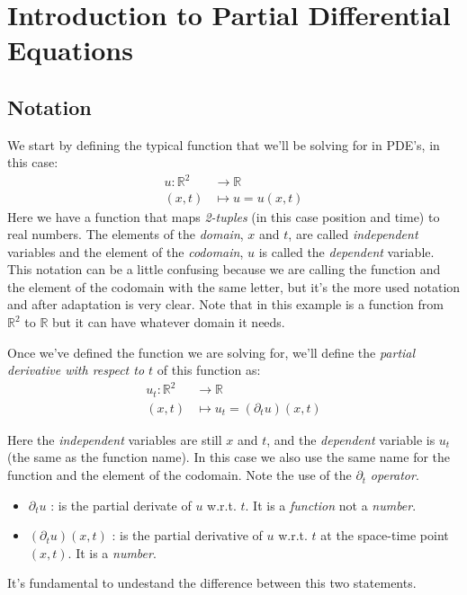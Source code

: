 \documentclass[../pde.tex]{subfiles}
\begin{document}
    \chapter{\sffamily Introduction to Partial Differential Equations}
    
    \section{\sffamily Notation}
    We start by defining the typical function that we'll be solving for in PDE's, in this case:
    \begin{align*}
        u : \mathbb{R}^2 &\rightarrow \mathbb{R} \\
            (x,t) &\mapsto u=u(x,t) 
    \end{align*}
    Here we have a function that maps \emph{2-tuples} (in this case position and time) to real numbers. The elements of the
    \emph{domain}, $x$ and $t $,  are called \emph{independent} variables and the element of the \emph{codomain}, $u$ is called
    the \emph{dependent} variable. This notation can be a little confusing because we are calling the function and the element of
    the codomain with the same letter, but it's the more used notation and after adaptation is very clear. Note that in this
    example is a function from $\mathbb{R} ^2$ to $\mathbb{R} $ but it can have whatever domain it needs.
    
    Once we've defined the function we are solving for, we'll define the \emph{partial derivative with respect to $t$} of this function as:
    \begin{align*}
        u_{t}: \mathbb{R} ^2 & \rightarrow \mathbb{R} \\
        (x,t) &\mapsto u_{t}=(\partial_{t} u)(x,t)
    \end{align*}
    
    Here the \emph{independent} variables are still $x$ and $t$, and the \emph{dependent} variable is $u_{t}$ (the same as the
    function name). In this case we also use the same name for the function and the element of the codomain. Note the use of the $\partial_{t} $
    \emph{operator}. 
    \begin{itemize}
        \item $\partial_{t} u$ : is the partial derivate of $u$ w.r.t. $t$. It is a \emph{function} not a \emph{number}.
        \item $(\partial_{t} u)(x,t)$ : is the partial derivative of $u$ w.r.t. $t$ at the space-time point $(x,t)$. It is a
            \emph{number}. 
    \end{itemize}
    It's fundamental to undestand the difference between this two statements.
    
\end{document}
